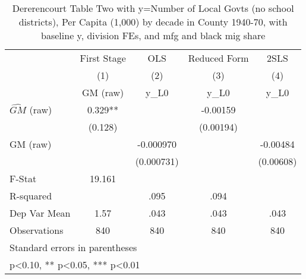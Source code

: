 \begin{table}[htbp]\centering
\def\sym#1{\ifmmode^{#1}\else\(^{#1}\)\fi}
\caption{Dererencourt Table Two with y=Number of Local Govts (no school districts), Per Capita (1,000) by decade in County 1940-70, with baseline y, division FEs, and mfg and black mig share}
\begin{tabular}{l*{4}{c}}
\toprule
                    & First Stage   &         OLS   &Reduced Form   &        2SLS   \\
                    &\multicolumn{1}{c}{(1)}&\multicolumn{1}{c}{(2)}&\multicolumn{1}{c}{(3)}&\multicolumn{1}{c}{(4)}\\
                    &\multicolumn{1}{c}{GM  (raw)}&\multicolumn{1}{c}{y\_L0}&\multicolumn{1}{c}{y\_L0}&\multicolumn{1}{c}{y\_L0}\\
\midrule
$\hat{GM}$ (raw)    &       0.329** &               &    -0.00159   &               \\
                    &     (0.128)   &               &   (0.00194)   &               \\
\addlinespace
GM  (raw)           &               &   -0.000970   &               &    -0.00484   \\
                    &               &  (0.000731)   &               &   (0.00608)   \\
\midrule
F-Stat              &      19.161   &               &               &               \\
R-squared           &               &        .095   &        .094   &               \\
Dep Var Mean        &        1.57   &        .043   &        .043   &        .043   \\
Observations        &         840   &         840   &         840   &         840   \\
\bottomrule
\multicolumn{5}{l}{\footnotesize Standard errors in parentheses}\\
\multicolumn{5}{l}{\footnotesize * p<0.10, ** p<0.05, *** p<0.01}\\
\end{tabular}
\end{table}
